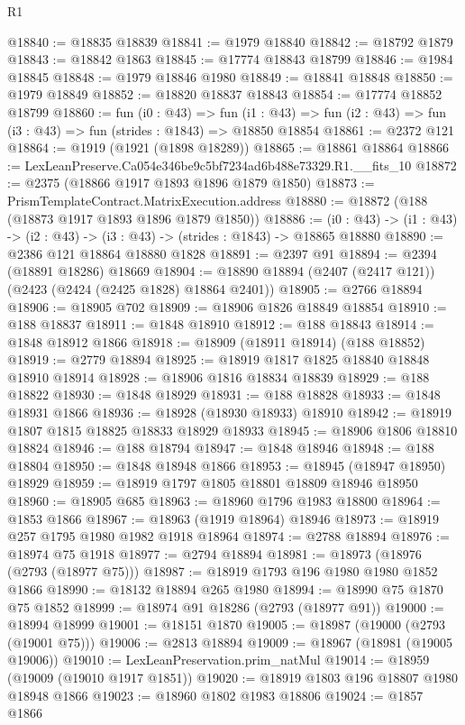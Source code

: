 \begin{lexlean}{R1}
\begin{coremodule}
@18840 := @18835 @18839
@18841 := @1979 @18840
@18842 := @18792 @1879
@18843 := @18842 @1863
@18845 := @17774 @18843 @18799
@18846 := @1984 @18845
@18848 := @1979 @18846 @1980
@18849 := @18841 @18848
@18850 := @1979 @18849
@18852 := @18820 @18837 @18843
@18854 := @17774 @18852 @18799
@18860 := fun (i0 : @43) =>
  fun (i1 : @43) => fun (i2 : @43) => fun (i3 : @43) => fun (strides : @1843) => @18850 @18854
@18861 := @2372 @121
@18864 := @1919 (@1921 (@1898 @18289))
@18865 := @18861 @18864
@18866 := LexLeanPreserve.Ca054e346be9c5bf7234ad6b488e73329.R1.__fits_10
@18872 := @2375 (@18866 @1917 @1893 @1896 @1879 @1850)
@18873 := PrismTemplateContract.MatrixExecution.address
@18880 := @18872 (@188 (@18873 @1917 @1893 @1896 @1879 @1850))
@18886 := (i0 : @43) -> (i1 : @43) -> (i2 : @43) -> (i3 : @43) -> (strides : @1843) -> @18865 @18880
@18890 := @2386 @121 @18864 @18880 @1828
@18891 := @2397 @91
@18894 := @2394 (@18891 @18286) @18669
@18904 := @18890 @18894 (@2407 (@2417 @121)) (@2423 (@2424 (@2425 @1828) @18864 @2401))
@18905 := @2766 @18894
@18906 := @18905 @702
@18909 := @18906 @1826 @18849 @18854
@18910 := @188 @18837
@18911 := @1848 @18910
@18912 := @188 @18843
@18914 := @1848 @18912 @1866
@18918 := @18909 (@18911 @18914) (@188 @18852)
@18919 := @2779 @18894
@18925 := @18919 @1817 @1825 @18840 @18848 @18910 @18914
@18928 := @18906 @1816 @18834 @18839
@18929 := @188 @18822
@18930 := @1848 @18929
@18931 := @188 @18828
@18933 := @1848 @18931 @1866
@18936 := @18928 (@18930 @18933) @18910
@18942 := @18919 @1807 @1815 @18825 @18833 @18929 @18933
@18945 := @18906 @1806 @18810 @18824
@18946 := @188 @18794
@18947 := @1848 @18946
@18948 := @188 @18804
@18950 := @1848 @18948 @1866
@18953 := @18945 (@18947 @18950) @18929
@18959 := @18919 @1797 @1805 @18801 @18809 @18946 @18950
@18960 := @18905 @685
@18963 := @18960 @1796 @1983 @18800
@18964 := @1853 @1866
@18967 := @18963 (@1919 @18964) @18946
@18973 := @18919 @257 @1795 @1980 @1982 @1918 @18964
@18974 := @2788 @18894
@18976 := @18974 @75 @1918
@18977 := @2794 @18894
@18981 := @18973 (@18976 (@2793 (@18977 @75)))
@18987 := @18919 @1793 @196 @1980 @1980 @1852 @1866
@18990 := @18132 @18894 @265 @1980
@18994 := @18990 @75 @1870 @75 @1852
@18999 := @18974 @91 @18286 (@2793 (@18977 @91))
@19000 := @18994 @18999
@19001 := @18151 @1870
@19005 := @18987 (@19000 (@2793 (@19001 @75)))
@19006 := @2813 @18894
@19009 := @18967 (@18981 (@19005 @19006))
@19010 := LexLeanPreservation.prim_natMul
@19014 := @18959 (@19009 (@19010 @1917 @1851))
@19020 := @18919 @1803 @196 @18807 @1980 @18948 @1866
@19023 := @18960 @1802 @1983 @18806
@19024 := @1857 @1866

\end{coremodule}
\end{lexlean}
